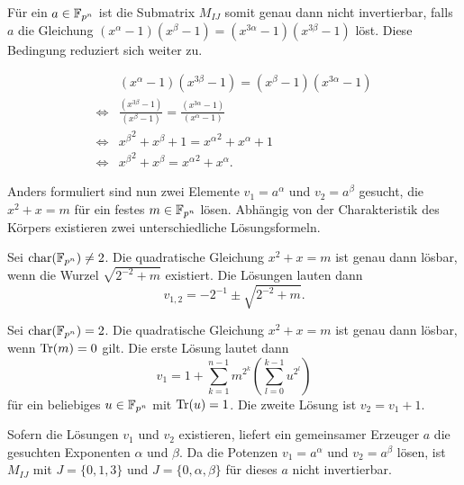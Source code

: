 Für ein $a \in \field{p}[n]$ ist die Submatrix $M_{IJ}$ somit genau dann nicht invertierbar, falls $a$ die Gleichung $(x^{\alpha} -1)(x^{\beta} -1) = (x^{3\alpha} -1)(x^{3\beta} -1)$ löst. Diese Bedingung reduziert sich weiter zu.

\begin{align}
        & (x^{\alpha} -1)(x^{3\beta} -1) = (x^{\beta} -1)(x^{3\alpha} -1) \nonumber \\
    \iff & \frac{(x^{3\beta} -1)}{(x^{\beta} -1)} = \frac{(x^{3\alpha} -1)}{(x^{\alpha} -1)} \nonumber \\
    \iff & {x^\beta}^2 + x^{\beta} + 1 = {x^{\alpha}}^2 + x^{\alpha} + 1 \nonumber \\
    \iff & {x^\beta}^2 + x^{\beta} = {x^{\alpha}}^2 + x^{\alpha}. \label{equation:013}
\end{align}

Anders formuliert sind nun zwei Elemente $v_1 = a^\alpha$ und $v_2 = a^\beta$ gesucht, die $x^2 + x = m$ für ein festes $m \in \field{p}[n]$ lösen. Abhängig von der Charakteristik des Körpers existieren zwei unterschiedliche Lösungsformeln.

\begin{lemma}
    Sei $\charac(\field{p}[n]) \neq 2$. Die quadratische Gleichung $x^2 + x = m$ ist genau dann lösbar, wenn die Wurzel $\sqrt{2^{-2} + m}$ existiert. Die Lösungen lauten dann
    \begin{equation*}
        v_{1,2} = -2^{-1} \pm \sqrt{2^{-2} + m}.
    \end{equation*}
\end{lemma}


\begin{lemma}
    Sei $\charac(\field{p}[n]) = 2$. Die quadratische Gleichung $x^2 + x = m$ ist genau dann lösbar, wenn $\mathrm{Tr}(m) = 0$ gilt. Die erste Lösung lautet dann
    \begin{equation*}
        v_1 = 1 + \sum_{k=1}^{n-1} m^{2^k}(\sum_{l=0}^{k-1} u^{2^l})
    \end{equation*}
     für ein beliebiges $u \in \field{p}[n]$ mit $\mathrm{Tr}(u) = 1$. Die zweite Lösung ist $v_2 = v_1 + 1$.
\end{lemma}

Sofern die Lösungen $v_1$ und $v_2$ existieren, liefert ein gemeinsamer Erzeuger $a$ die gesuchten Exponenten $\alpha$ und $\beta$. Da die Potenzen $v_1 = a^\alpha$ und $v_2 = a^\beta$  lösen, ist $M_{IJ}$ mit $J = \{0,1,3\}$ und $J = \{0,\alpha,\beta\}$ für dieses $a$ nicht invertierbar.

